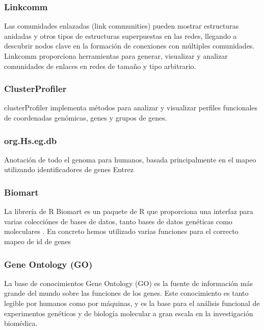 \subsubsection{Linkcomm}

Las comunidades enlazadas (link communities) pueden mostrar estructuras anidadas y otros tipos de estructuras superpuestas en las redes, llegando a descubrir nodos clave en la formación de conexiones con múltiples comunidades. Linkcomm \cite{Linkcomm_paper} proporciona herramientas para generar, visualizar y analizar comunidades de enlaces en redes de tamaño y tipo arbitrario.

\subsubsection{ClusterProfiler}

clusterProfiler \cite{ClusterProfiler_paper} implementa métodos para analizar y visualizar perfiles funcionales de coordenadas genómicas, genes y grupos de genes.

\subsubsection{org.Hs.eg.db} 

Anotación de todo el genoma para humanos, basada principalmente en el mapeo utilizando identificadores de genes Entrez

\subsubsection{Biomart}

La librería de R Biomart es un paquete de R que proporciona una interfaz para varias colecciónes de bases de datos, tanto bases de datos genéticas como moleculares \cite{biomart}. En concreto hemos utilizado varias funciones para el correcto mapeo de id de genes

\subsubsection{Gene Ontology (GO)}

La base de conocimientos Gene Ontology (GO) \cite{GO_doi} es la fuente de información más grande del mundo sobre las funciones de los genes. Este conocimiento es tanto legible por humanos como por máquinas, y es la base para el análisis funcional de experimentos genéticos y de biología molecular a gran escala en la investigación biomédica.






\hfill




\newpage